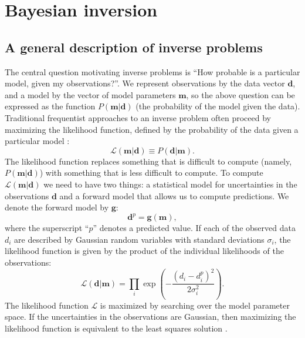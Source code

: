 \documentclass[11pt,letterpaper]{article}
\begin{document}
\section*{Bayesian inversion}
\subsection*{A general description of inverse problems}

The central question motivating inverse problems is ``How probable is a particular model, given my observations?''. We represent observations by the data vector $\mathbf{d}$, and a model by the vector of model parameters $\mathbf{m}$, so the above question can be expressed as the function $P(\mathbf{m} \vert \mathbf{d})$ (the probability of the model given the data). Traditional frequentist approaches to an inverse problem often proceed by maximizing the likelihood function, defined by the probability of the data given a particular model \citep[e.g.][]{Aster2005a}:
\begin{equation}
\mathcal{L} ( \mathbf{m} \vert \mathbf{d} ) \equiv P( \mathbf{d} \vert \mathbf{m} ).
\label{eq:likelihood}
\end{equation}
The likelihood function replaces something that is difficult to compute (namely, $P(\mathbf{m} \vert \mathbf{d})$)
with something that is less difficult to compute. 
To compute $\mathcal{L}(\mathbf{m} \vert \mathbf{d})$ we need to have two things: a statistical model for 
uncertainties in the observations $\mathbf{d}$ and a forward model that allows us to compute
predictions. We denote the forward model by $\mathbf{g}$:
\begin{equation}
\mathbf{d}^p = \mathbf{g}(\mathbf{m}),
\label{eq:forward}
\end{equation}
where the superscript ``$p$'' denotes a predicted value.
If each of the observed data $d_i$ are described by Gaussian random variables with standard deviations $\sigma_i$, the likelihood function is given by the product of the individual likelihoods of the observations:
\begin{equation}
\mathcal{L}(\mathbf{d} | \mathbf{m} ) = \displaystyle\prod_i \exp\left({-\frac{(d_i - d_{i}^p)^2}{2 \sigma_i^2}}\right).
\label{eq:example_likelihood}
\end{equation}
The likelihood function $\mathcal{L}$ is maximized by searching over the model parameter space.
If the uncertainties in the observations are Gaussian, then maximizing the likelihood function is
equivalent to the least squares solution \citep{Aster2005a}.
\end{document}
